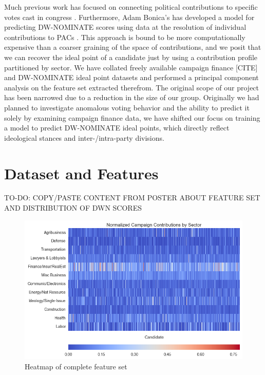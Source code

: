\documentclass[10]{article}
\begin{document}
\noindent Much previous work has focused on connecting political contributions to specific votes cast in congress \cite{stratmann1991campaign,stratmann1995campaign}. Furthermore, Adam Bonica's has developed a model for predicting DW-NOMINATE scores using data at the resolution of individual contributions to PACs \cite{bonica2013ideology}. This approach is bound to be more computationally expensive than a coarser graining of the space of contributions, and we posit that we can recover the ideal point of a candidate just by using a contribution profile partitioned by sector. We have collated freely available campaign finance [CITE] and DW-NOMINATE ideal point \cite{DWWEB} datasets and performed a principal component analysis on the feature set extracted therefrom. The original scope of our project has been narrowed due to a reduction in the size of our group. Originally we had planned to investigate anomalous voting behavior and the ability to predict it solely by examining campaign finance data, we have shifted our focus on training a model to predict DW-NOMINATE ideal points, which directly reflect ideological stances and inter-/intra-party divisions.\\

\section*{Dataset and Features}

TO-DO: COPY/PASTE CONTENT FROM POSTER ABOUT FEATURE SET AND DISTRIBUTION OF DWN SCORES  

\begin{figure}[H]
\centering
\includegraphics[width=.8\textwidth]{cand_2010_2012_2014_fm_trim_normed_feature_hm.png}
\caption{\label{fig:pc_all}Heatmap of complete feature set}
\end{figure}
\end{document}
